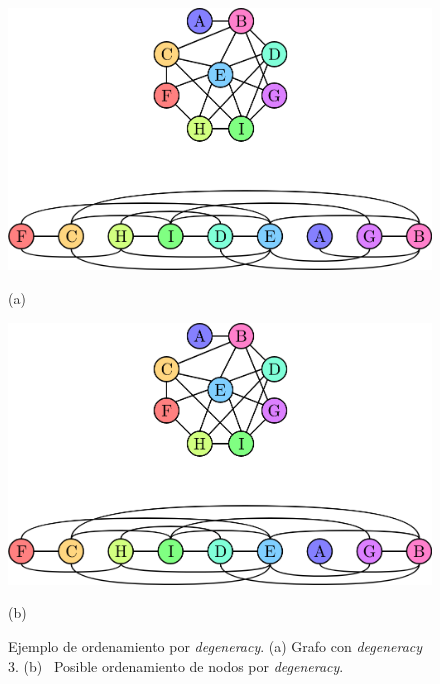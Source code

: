 \begin{figure}%
    	\centering
    	\begin{minipage}{0.25\textwidth}
    		\centering
    		\includegraphics[scale=.3, clip,  trim=330 300 330 0]{img/arte/graphs-degeneracyOrder.png}
    		
    		(a)
    	\end{minipage}
    	\begin{minipage}{0.65\textwidth}
    		\centering
    		\includegraphics[scale=.28, clip, trim=0 0 0 420]{img/arte/graphs-degeneracyOrder.png}
    		
    		(b)
    	\end{minipage}

    \caption{Ejemplo de ordenamiento por \textit{degeneracy}. (a) Grafo con \textit{degeneracy} 3. (b)~ Posible ordenamiento de nodos por \textit{degeneracy}.}
    \label{fig:degenOrder}
\end{figure}
